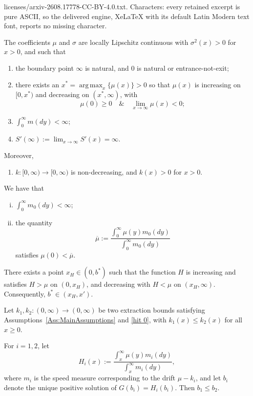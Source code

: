 \documentclass[10pt,a4paper]{amsart}
\DeclareMathOperator*{\argmax}{arg\,max}
\begin{document}
licenses/arxiv-2608.17778-CC-BY-4.0.txt. Characters: every retained excerpt is pure ASCII, so the delivered engine, XeLaTeX with its default Latin Modern text font, reports no missing character.
\begin{assumption} \label{Ass:MainAssumptions} 
The coefficients $\mu$ and $\sigma$ are locally Lipschitz continuous with $\sigma^2(x)>0$ for $x>0$, and such that 
    \begin{enumerate}     
            \item[(i)]
            the boundary point $\infty$ is natural, and 0 is natural or entrance-not-exit;
            \item[(ii)]
        there exists an $x^* =\argmax_x \{ \mu(x) \}>0$ so that $\mu(x)$ is increasing on $[0, x^*)$ and decreasing on $(x^*, \infty)$, with
        \[ \mu(0) \geq 0 \quad\&\quad\lim_{x \to \infty} \mu(x) < 0;\]
        \item[(iii)]
        $\int_0^{\infty} m(dy) <\infty$;
        \item[(iv)]
        $S'(\infty):=\lim_{x\to\infty}S'(x)=\infty$.
    \end{enumerate}
    Moreover, 
      \begin{enumerate}     
            \item[(v)]
            $k:[0,\infty)\to[0,\infty)$ is non-decreasing, and $k(x)>0$ for $x>0$.
              \end{enumerate}
\end{assumption}

\begin{assumption}\label{hit 0}
We have that
\begin{enumerate}[(i)]
    \item 
    $\int_0^\infty m_0(dy)<\infty$;
    \item 
    the quantity 
\[\overline\mu:=\frac{\int_0^{\infty}\mu(y)m_0(dy)}{\int_0^\infty m_0(dy)}\]
    satisfies $\mu(0)<\overline\mu$.
\end{enumerate}
\end{assumption}

\begin{lemma} \label{Lemma: Hshape}
    There exists a point $x_H \in(0,b^*)$ such that the function $H$ is increasing and satisfies $H> \mu$ on $(0,x_H)$, and decreasing with $H<\mu$ on $(x_H,\infty)$. Consequently, $b^* \in (x_H, x')$.
\end{lemma}

\begin{proposition} \label{Prop: k1k2ordering}
    Let $k_1,k_2: (0,\infty) \to (0,\infty)$ be two extraction bounds satisfying Assumptions~\ref{Ass:MainAssumptions} and \ref{hit 0}, with $k_1(x) \leq k_2(x)$ for all $x \geq 0.$
    
    For $i=1,2$, let
    \begin{equation*}
        H_i(x) := \frac{\int_x^\infty \mu(y)m_{i}(dy)}{\int_x^\infty m_{i}(dy)},
    \end{equation*}
    where $m_{i}$ is the speed measure corresponding to the drift $\mu-k_i$, and let $b_i$ denote the unique positive solution of $G(b_i) = H_i(b_i).$ Then $b_1 \leq b_2.$
\end{proposition}
\end{document}
